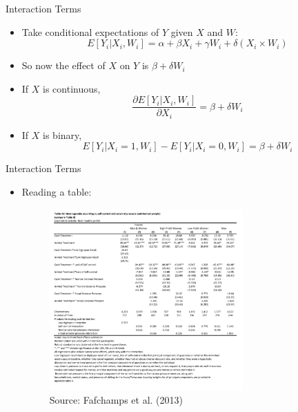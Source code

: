 \documentclass[11pt,notes=hide,aspectratio=169,mathserif]{beamer}
\begin{document}
\begin{frame}{Interaction Terms}
\begin{itemize}
\item Take conditional expectations of $Y$ given $X$ and $W$:
\begin{equation}
\label{eq:3}
    E[Y_i|X_i,W_i] = \alpha + \beta X_i + \gamma W_i + \delta (X_i \times W_i)
\end{equation}
\pause \item So now the effect of $X$ on $Y$ is $\beta + \delta W_i$
\pause \item If $X$ is continuous, 
\begin{equation}
\label{eq:4}
    \frac{\partial E[Y_i|X_i,W_i]}{\partial X_i} = \beta + \delta W_i
\end{equation}
\pause \item If $X$ is binary,
\begin{equation}
\label{eq:5}
    E[Y_i|X_i=1,W_i] - E[Y_i|X_i=0,W_i] = \beta + \delta W_i
\end{equation}
\end{itemize}
\end{frame}

\begin{frame}{Interaction Terms}
\begin{itemize}
\item Reading a table:
\begin{figure}
\centering
\includegraphics[width=0.7\textwidth]{inputs/interactions.png}
\caption{Source: Fafchamps et al. (2013)}
\end{figure}
\end{itemize}
\end{frame}
\end{document}

